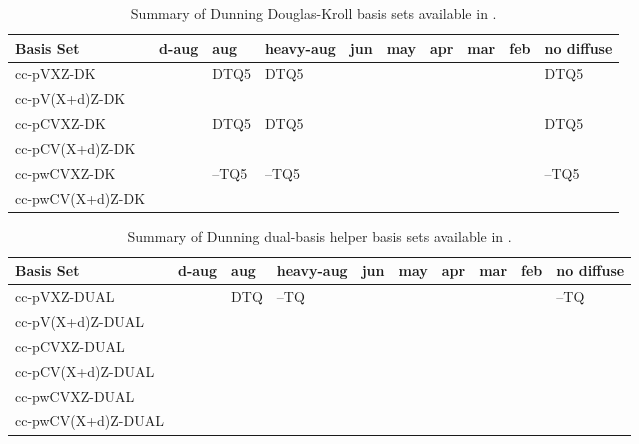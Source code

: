 \begin{table}[!htbp]
\begin{footnotesize}
\caption{Summary of Dunning Douglas-Kroll basis sets available in \PSIfour.} \label{table:basisDunningDK}
\parsep 10pt
\begin{center}
\begin{tabular}{llllllllll}
\hline\hline
Basis Set            & d-aug & aug & heavy-aug\cite{basisnote1} & jun & may & apr & mar & feb & no diffuse \\ 
\hline
cc-pVXZ-DK           &  & DTQ5  & DTQ5  &  &  &  &  &  & DTQ5  \\
cc-pV(X+d)Z-DK       &  &       &       &  &  &  &  &  &       \\
cc-pCVXZ-DK          &  & DTQ5  & DTQ5  &  &  &  &  &  & DTQ5  \\
cc-pCV(X+d)Z-DK      &  &       &       &  &  &  &  &  &       \\
cc-pwCVXZ-DK         &  & --TQ5 & --TQ5 &  &  &  &  &  & --TQ5 \\
cc-pwCV(X+d)Z-DK     &  &       &       &  &  &  &  &  &       \\
\hline\hline
\end{tabular}
\end{center}
\end{footnotesize}
\end{table}


\begin{table}[!htbp]
\begin{footnotesize}
\caption{Summary of Dunning dual-basis helper basis sets available in \PSIfour.} \label{table:basisDunningDUAL}
\parsep 10pt
\begin{center}
\begin{tabular}{llllllllll}
\hline\hline
Basis Set            & d-aug & aug & heavy-aug\cite{basisnote1} & jun & may & apr & mar & feb & no diffuse \\ 
\hline
cc-pVXZ-DUAL         &  & DTQ & --TQ &  &  &  &  &  & --TQ \\
cc-pV(X+d)Z-DUAL     &  &     &      &  &  &  &  &  &      \\
cc-pCVXZ-DUAL        &  &     &      &  &  &  &  &  &      \\
cc-pCV(X+d)Z-DUAL    &  &     &      &  &  &  &  &  &      \\
cc-pwCVXZ-DUAL       &  &     &      &  &  &  &  &  &      \\
cc-pwCV(X+d)Z-DUAL   &  &     &      &  &  &  &  &  &      \\
\hline\hline
\end{tabular}
\end{center}
\end{footnotesize}
\end{table}


